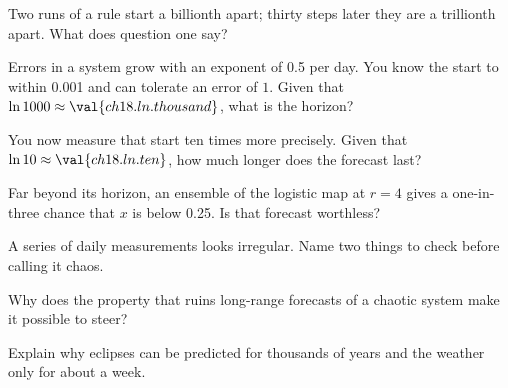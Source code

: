 \canyou

\begin{checkpoint}
\item Two runs of a rule start a billionth apart; thirty steps later they
  are a trillionth apart. What does question one say?
\item Errors in a system grow with an exponent of \num{0.5} per day. You
  know the start to within \num{0.001} and can tolerate an error of $1$.
  Given that $\ln 1000 \approx \val{ch18.ln.thousand}$, what is the horizon?
\item You now measure that start ten times more precisely. Given that
  $\ln 10 \approx \val{ch18.ln.ten}$, how much longer does the forecast
  last?
\item Far beyond its horizon, an ensemble of the logistic map at $r = 4$
  gives a one-in-three chance that $x$ is below \num{0.25}. Is that forecast
  worthless?
\item A series of daily measurements looks irregular. Name two things to
  check before calling it chaos.
\item Why does the property that ruins long-range forecasts of a chaotic
  system make it possible to steer?
\item Explain why eclipses can be predicted for thousands of years and the
  weather only for about a week.
\end{checkpoint}
